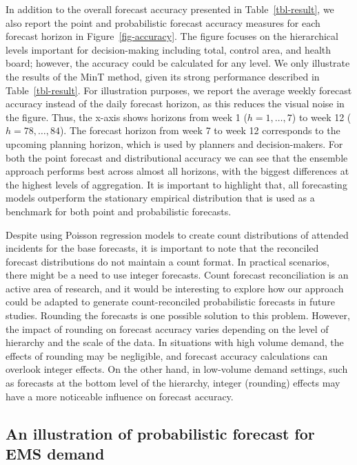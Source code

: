\documentclass[
  authoryear,
  preprint,
  3p]{elsarticle}
\begin{document}
In addition to the overall forecast accuracy presented in
Table~\ref{tbl-result}, we also report the point and probabilistic
forecast accuracy measures for each forecast horizon in
Figure~\ref{fig-accuracy}. The figure focuses on the hierarchical levels
important for decision-making including total, control area, and health
board; however, the accuracy could be calculated for any level. We only
illustrate the results of the MinT method, given its strong performance
described in Table~\ref{tbl-result}. For illustration purposes, we
report the average weekly forecast accuracy instead of the daily
forecast horizon, as this reduces the visual noise in the figure. Thus,
the x-axis shows horizons from week 1 (\(h= 1,\dots,7\)) to week 12
(\(h= 78,\dots,84\)). The forecast horizon from week 7 to week 12
corresponds to the upcoming planning horizon, which is used by planners
and decision-makers. For both the point forecast and distributional
accuracy we can see that the ensemble approach performs best across
almost all horizons, with the biggest differences at the highest levels
of aggregation. It is important to highlight that, all forecasting
models outperform the stationary empirical distribution that is used as
a benchmark for both point and probabilistic forecasts.

Despite using Poisson regression models to create count distributions of
attended incidents for the base forecasts, it is important to note that
the reconciled forecast distributions do not maintain a count format. In
practical scenarios, there might be a need to use integer forecasts.
Count forecast reconciliation is an active area of research, and it
would be interesting to explore how our approach could be adapted to
generate count-reconciled probabilistic forecasts in future studies.
Rounding the forecasts is one possible solution to this problem.
However, the impact of rounding on forecast accuracy varies depending on
the level of hierarchy and the scale of the data. In situations with
high volume demand, the effects of rounding may be negligible, and
forecast accuracy calculations can overlook integer effects. On the
other hand, in low-volume demand settings, such as forecasts at the
bottom level of the hierarchy, integer (rounding) effects may have a
more noticeable influence on forecast accuracy.

\hypertarget{an-illustration-of-probabilistic-forecast-for-ems-demand}{%
\subsection{An illustration of probabilistic forecast for EMS
demand}\label{an-illustration-of-probabilistic-forecast-for-ems-demand}}
\end{document}
